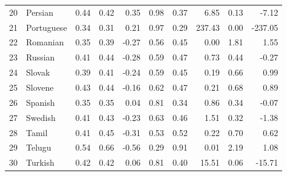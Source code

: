 \documentclass[a4paper]{article}
\begin{document}
\begin{table}[hhbtp]
\begin{tabular}{rlrrrrrrrr}
		20 & Persian & 0.44 & 0.42 & 0.35 & 0.98 & 0.37 & 6.85 & 0.13 & -7.12 \\ 
		21 & Portuguese & 0.34 & 0.31 & 0.21 & 0.97 & 0.29 & 237.43 & 0.00 & -237.05 \\ 
		22 & Romanian & 0.35 & 0.39 & -0.27 & 0.56 & 0.45 & 0.00 & 1.81 & 1.55 \\ 
		23 & Russian & 0.41 & 0.44 & -0.28 & 0.59 & 0.47 & 0.73 & 0.44 & -0.27 \\ 
		24 & Slovak & 0.39 & 0.41 & -0.24 & 0.59 & 0.45 & 0.19 & 0.66 & 0.99 \\ 
		25 & Slovene & 0.43 & 0.44 & -0.16 & 0.62 & 0.47 & 0.21 & 0.68 & 0.89 \\ 
		26 & Spanish & 0.35 & 0.35 & 0.04 & 0.81 & 0.34 & 0.86 & 0.34 & -0.07 \\ 
		27 & Swedish & 0.41 & 0.43 & -0.23 & 0.63 & 0.46 & 1.51 & 0.32 & -1.38 \\ 
		28 & Tamil & 0.41 & 0.45 & -0.31 & 0.53 & 0.52 & 0.22 & 0.70 & 0.62 \\ 
		29 & Telugu & 0.54 & 0.66 & -0.56 & 0.29 & 0.91 & 0.01 & 2.19 & 1.08 \\ 
		30 & Turkish & 0.42 & 0.42 & 0.06 & 0.81 & 0.40 & 15.51 & 0.06 & -15.71 \\ 
		\hline
	\end{tabular}
\end{table}
\end{document}
